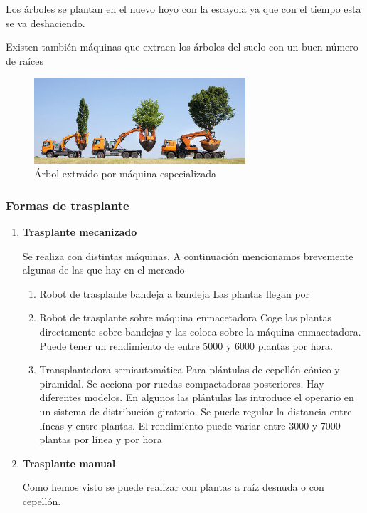 \documentclass[a4paper,12pt,oneside]{article}
\begin{document}
\begin{enumerate}
\begin{enumerate}
Los árboles se plantan en el nuevo hoyo con la escayola ya que con el tiempo
esta se va deshaciendo.

Existen también máquinas que extraen los árboles del suelo con un buen número de
raíces  

\begin{figure}[htbp]
\centering
\includegraphics[width=0.7\textwidth]{./img_uf1596/arbol_transplante_maquina.jpg}
\caption{Árbol extraído por máquina especializada}
\end{figure}
\end{enumerate}
\end{enumerate}

\subsubsection{Formas de trasplante}
\label{sec:org78150e4}

\begin{enumerate}
\item \textbf{Trasplante mecanizado}
\label{sec:orgdf50404}

Se realiza con distintas máquinas. A continuación mencionamos brevemente algunas
de las que hay en el mercado

\begin{enumerate}
\item Robot de trasplante bandeja a bandeja
\label{sec:org8617026}
Las plantas llegan por     
\item Robot de trasplante sobre máquina enmacetadora
\label{sec:orge04ff7a}
Coge las plantas directamente sobre bandejas y las coloca sobre la máquina enmacetadora. Puede tener un rendimiento de entre 5000 y 6000 plantas por hora.
\item Transplantadora semiautomática
\label{sec:orgc7a3b9a}
Para plántulas de cepellón cónico y piramidal. Se acciona por ruedas compactadoras posteriores. Hay diferentes modelos. En algunos las plántulas las introduce el operario en un sistema de distribución giratorio. Se puede regular la distancia entre líneas y entre plantas. El rendimiento puede variar entre 3000 y 7000 plantas por línea y por hora
\end{enumerate}
\item \textbf{Trasplante manual}
\label{sec:org75e7f80}

Como hemos visto se puede realizar con plantas a raíz desnuda o con cepellón.
\end{enumerate}
\end{document}
